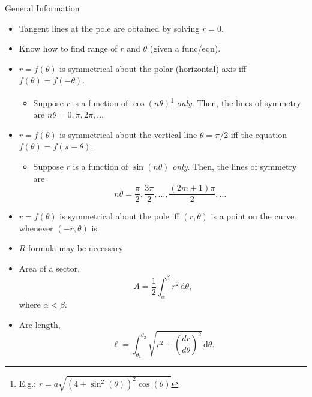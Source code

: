 \documentclass[oneside]{book}
\begin{document}
\begin{stbox}{General Information}{}
\begin{itemize}[label=\(\circ\)]
\begin{longtable}{|Sc|Sc|Sc|}
\begin{tabular}{@{}Sc@{}}
\end{tabular}& \(x^2+\left(y-\dfrac{a}{2}\right)^2=\dfrac{a^2}{4}\)\\
\hline
    \end{longtable}
    \item Tangent lines at the pole are obtained by solving \(r=0\).
    \item Know how to find range of \(r\) and \(\theta\) (given a func/eqn).
    \item \(r=f(\theta)\) is symmetrical about the polar (horizontal) axis iff \(f(\theta)=f(-\theta)\).
    \begin{itemize}
      \item Suppose \(r\) is a function of \(\cos(n\theta)\)\footnote{E.g.: \(r=a\sqrt{(4+\sin^2(\theta))^2\cos(\theta)}\)} \emph{only}. Then, the lines of symmetry are \(n\theta=0,\pi,2\pi,\ldots\)
    \end{itemize}
    \item \(r=f(\theta)\) is symmetrical about the vertical line \(\theta=\pi/2\) iff the equation \(f(\theta)=f(\pi-\theta)\).
    \begin{itemize}
      \item Suppose \(r\) is a function of \(\sin(n\theta)\) \emph{only}. Then, the lines of symmetry are 
      \[n\theta=\frac{\pi}{2},\frac{3\pi}{2},\ldots,\frac{(2m+1)\pi}{2},\ldots\]
    \end{itemize}
    \item \(r=f(\theta)\) is symmetrical about the pole iff \((r,\theta)\) is a point on the curve whenever \((-r,\theta)\) is.
    \item \(R\)-formula may be necessary
    \item Area of a sector, 
    \[A=\dfrac{1}{2}\int_{\alpha}^{\beta}r^2\,\text{d}\theta,\] 
    where \(\alpha<\beta\).
    \item Arc length, 
    \[\ell=\int_{\theta_1}^{\theta_2} \sqrt{r^2+\left(\frac{dr}{d\theta}\right)^2}\,\text{d}\theta.\]
  \end{itemize}
\end{stbox}
\end{document}

